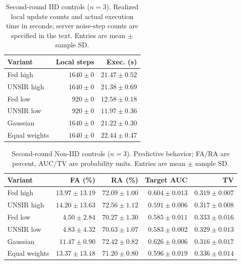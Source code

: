 \documentclass[software,article,submit,moreauthors]{Definitions/mdpi}
\begin{document}
\begin{table}[H]\centering\footnotesize\setlength{\tabcolsep}{4pt}
\caption{Second-round IID controls ($n=3$). Realized local update counts and actual execution time in seconds; server noise-step counts are specified in the text. Entries are mean $\pm$ sample SD.}
\label{tab:round2-iid-compute}
\begin{tabular}{lrr}\toprule Variant & Local steps & Exec. (s)\\\midrule
Fed high & $1640 \pm 0$ & $21.47 \pm 0.52$\\
UNSIR high & $1640 \pm 0$ & $21.38 \pm 0.69$\\
Fed low & $920 \pm 0$ & $12.58 \pm 0.18$\\
UNSIR low & $920 \pm 0$ & $11.97 \pm 0.36$\\
Gaussian & $1640 \pm 0$ & $21.22 \pm 0.30$\\
Equal weights & $1640 \pm 0$ & $22.44 \pm 0.47$\\
\bottomrule\end{tabular}\end{table}
\begin{table}[H]\centering\footnotesize\setlength{\tabcolsep}{4pt}
\caption{Second-round Non-IID controls ($n=3$). Predictive behavior; FA/RA are percent, AUC/TV are probability units. Entries are mean $\pm$ sample SD.}
\label{tab:round2-noniid}
\begin{tabular}{lrrrr}\toprule Variant & FA (\%) & RA (\%) & Target AUC & TV\\\midrule
Fed high & $13.97 \pm 13.19$ & $72.09 \pm 1.00$ & $0.604 \pm 0.013$ & $0.319 \pm 0.007$\\
UNSIR high & $14.20 \pm 13.63$ & $72.56 \pm 1.12$ & $0.591 \pm 0.006$ & $0.317 \pm 0.008$\\
Fed low & $4.50 \pm 2.84$ & $70.27 \pm 1.30$ & $0.585 \pm 0.011$ & $0.333 \pm 0.016$\\
UNSIR low & $4.83 \pm 4.32$ & $70.63 \pm 1.07$ & $0.583 \pm 0.002$ & $0.329 \pm 0.013$\\
Gaussian & $11.47 \pm 0.90$ & $72.42 \pm 0.82$ & $0.626 \pm 0.006$ & $0.316 \pm 0.017$\\
Equal weights & $13.37 \pm 13.18$ & $71.20 \pm 0.80$ & $0.596 \pm 0.019$ & $0.336 \pm 0.014$\\
\bottomrule\end{tabular}\end{table}
\end{document}
